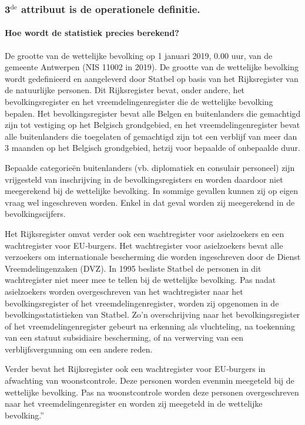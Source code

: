 \documentclass{beamer}
\begin{document}
\begin{frame}
\frametitle{3$^\text{de}$ attribuut is de operationele definitie.}
\framesubtitle{Hoe wordt de statistiek precies berekend?}
\pause
\tiny
{}De grootte van de wettelijke bevolking op 1 januari 2019, 0.00 uur, van de gemeente Antwerpen (NIS 11002 in 2019). De grootte van de wettelijke bevolking wordt gedefinieerd en aangeleverd door Statbel op basis van het Rijksregister van de natuurlijke personen. Dit Rijksregister bevat, onder andere, het bevolkingsregister en het vreemdelingenregister die de wettelijke bevolking bepalen. Het bevolkingsregister bevat alle Belgen en buitenlanders die gemachtigd zijn tot vestiging op het Belgisch grondgebied, en het vreemdelingenregister bevat alle buitenlanders die toegelaten of gemachtigd zijn tot een verblijf van meer dan 3 maanden op het Belgisch grondgebied, hetzij voor bepaalde of onbepaalde duur.\par	
Bepaalde categorieën buitenlanders (vb. diplomatiek en consulair personeel) zijn vrijgesteld van inschrijving in de bevolkingsregisters en worden daardoor niet meegerekend bij de wettelijke bevolking. In sommige gevallen kunnen zij op eigen vraag wel ingeschreven worden. Enkel in dat geval worden zij meegerekend in de bevolkingscijfers.\par 		
Het Rijksregister omvat verder ook een wachtregister voor asielzoekers en een wachtregister voor EU‐burgers. Het wachtregister voor asielzoekers bevat alle verzoekers om internationale bescherming die worden ingeschreven door de Dienst Vreemdelingenzaken (DVZ). In 1995 besliste Statbel de personen in dit wachtregister niet meer mee te tellen bij de wettelijke bevolking. Pas nadat asielzoekers worden overgeschreven van het wachtregister naar het bevolkingsregister of het vreemdelingenregister, worden zij opgenomen in de bevolkingsstatistieken van Statbel. Zo'n overschrijving naar het bevolkingsregister of het vreemdelingenregister gebeurt na erkenning als vluchteling, na toekenning van een statuut subsidiaire bescherming, of na verwerving van een verblijfsvergunning om een andere reden.\par		
Verder bevat het Rijksregister ook een wachtregister voor EU‐burgers in afwachting van woonstcontrole. Deze personen worden evenmin meegeteld bij de wettelijke bevolking. Pas na woonstcontrole worden deze personen overgeschreven naar het vreemdelingenregister en worden zij meegeteld in de wettelijke bevolking.''
\end{frame}
\end{document}
